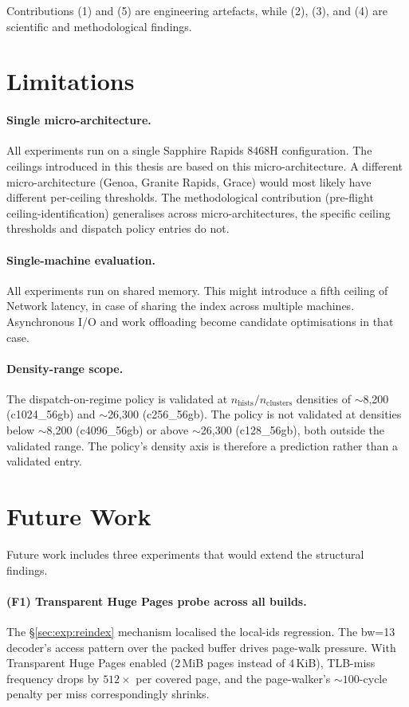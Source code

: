 Contributions (1) and (5) are engineering artefacts, while (2), (3), and (4) are scientific and methodological findings.

\section{Limitations}

\paragraph{Single micro-architecture.}
All experiments run on a single Sapphire Rapids 8468H configuration. The ceilings introduced in this thesis are based on this micro-architecture. A different micro-architecture (Genoa, Granite Rapids, Grace) would most likely have different per-ceiling thresholds. The methodological contribution (pre-flight ceiling-identification) generalises across micro-architectures, the specific ceiling thresholds and dispatch policy entries do not.

\paragraph{Single-machine evaluation.}
All experiments run on shared memory. This might introduce a fifth ceiling of Network latency, in case of sharing the index across multiple machines. Asynchronous I/O and work offloading become candidate optimisations in that case.

\paragraph{Density-range scope.}
The dispatch-on-regime policy is validated at \(n_\text{hists}/n_\text{clusters}\) densities of $\sim$8,200 (c1024\_56gb) and $\sim$26,300 (c256\_56gb). The policy is not validated at densities below $\sim$8,200 (c4096\_56gb) or above $\sim$26,300 (c128\_56gb), both outside the validated range. The policy's density axis is therefore a prediction rather than a validated entry.

\section{Future Work}

Future work includes three experiments that would extend the structural findings.

\paragraph{(F1) Transparent Huge Pages probe across all builds.}
The §\ref{sec:exp:reindex} mechanism localised the local-ids regression. The bw=13 decoder's access pattern over the packed buffer drives page-walk pressure. With Transparent Huge Pages enabled ($2$\,MiB pages instead of $4$\,KiB), TLB-miss frequency drops by $512\times$ per covered page, and the page-walker's $\sim\!100$-cycle penalty per miss correspondingly shrinks.

